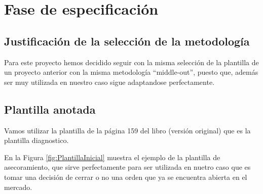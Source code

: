 \section{Fase de especificación}
\subsection{Justificación de la selección de la metodología}
Para este proyecto hemos decidido seguir con la misma selección de la plantilla de un proyecto anterior con la misma metodología ``middle-out'', puesto que, además ser muy utilizada en nuestro caso sigue adaptandose perfectamente. 

\subsection{Plantilla anotada}

Vamos utilizar la plantilla de la página 159 del libro (versión original) que es la plantilla diagnostico.

En la Figura \ref{fig:PlantillaInicial} muestra el ejemplo de la plantilla de asecoramiento, que sirve perfectamente para ser utilizada en nuetro caso que es tomar una decisión de cerrar o no una orden que ya se encuentra abierta en el mercado.